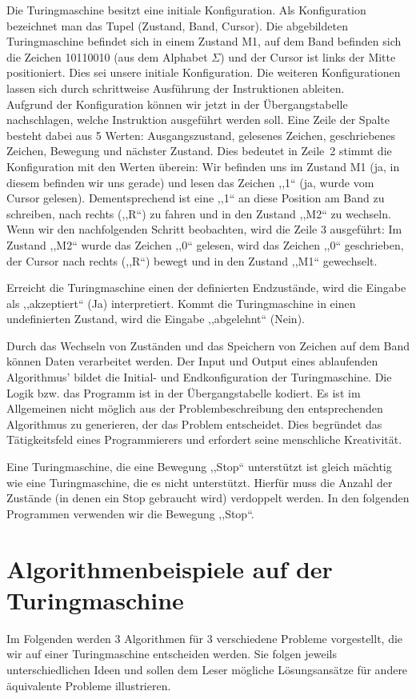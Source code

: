 Die Turingmaschine besitzt eine initiale Konfiguration. Als Konfiguration bezeichnet man das Tupel (Zustand, Band, Cursor). Die abgebildeten Turingmaschine befindet sich in einem Zustand M1, auf dem Band befinden sich die Zeichen 10110010 (aus dem Alphabet $\Sigma$) und der Cursor ist links der Mitte positioniert. Dies sei unsere initiale Konfiguration. Die weiteren Konfigurationen lassen sich durch schrittweise Ausführung der Instruktionen ableiten. \\
Aufgrund der Konfiguration können wir jetzt in der Übergangstabelle nachschlagen, welche Instruktion ausgeführt werden soll. Eine Zeile der Spalte besteht dabei aus 5 Werten: Ausgangszustand, gelesenes Zeichen, geschriebenes Zeichen, Bewegung und nächster Zustand. Dies bedeutet in Zeile~2 stimmt die Konfiguration mit den Werten überein: Wir befinden uns im Zustand M1 (ja, in diesem befinden wir uns gerade) und lesen das Zeichen ,,1`` (ja, wurde vom Cursor gelesen). Dementsprechend ist eine ,,1`` an diese Position am Band zu schreiben, nach rechts (,,R``) zu fahren und in den Zustand ,,M2`` zu wechseln. Wenn wir den nachfolgenden Schritt beobachten, wird die Zeile 3 ausgeführt: Im Zustand ,,M2`` wurde das Zeichen ,,0`` gelesen, wird das Zeichen ,,0`` geschrieben, der Cursor nach rechts (,,R``) bewegt und in den Zustand ,,M1`` gewechselt.

Erreicht die Turingmaschine einen der definierten Endzustände, wird die Eingabe als ,,akzeptiert`` (Ja) interpretiert. Kommt die Turingmaschine in einen undefinierten Zustand, wird die Eingabe ,,abgelehnt`` (Nein).

Durch das Wechseln von Zuständen und das Speichern von Zeichen auf dem Band können Daten verarbeitet werden. Der Input und Output eines ablaufenden Algorithmus' bildet die Initial- und Endkonfiguration der Turingmaschine. Die Logik bzw. das Programm ist in der Übergangstabelle kodiert. Es ist im Allgemeinen nicht möglich aus der Problembeschreibung den entsprechenden Algorithmus zu generieren, der das Problem entscheidet. Dies begründet das Tätigkeitsfeld eines Programmierers und erfordert seine menschliche Kreativität.

Eine Turingmaschine, die eine Bewegung ,,Stop`` unterstützt ist gleich mächtig wie eine Turingmaschine, die es nicht unterstützt. Hierfür muss die Anzahl der Zustände (in denen ein Stop gebraucht wird) verdoppelt werden. In den folgenden Programmen verwenden wir die Bewegung ,,Stop``.

\section{Algorithmenbeispiele auf der Turingmaschine}
%
Im Folgenden werden 3 Algorithmen für 3 verschiedene Probleme vorgestellt, die wir auf einer Turingmaschine entscheiden werden. Sie folgen jeweils unterschiedlichen Ideen und sollen dem Leser mögliche Lösungsansätze für andere äquivalente Probleme illustrieren.

